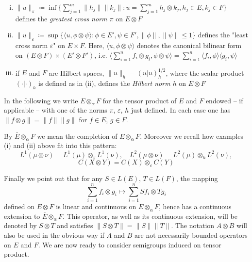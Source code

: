 \begin{enumerate}[(i), wide]
\item
$\|u\|_{\pi} \coloneqq \inf\{\sum_{j=1}^{m} \|h_{j}\|\|k_{j}\| : u = \sum_{j=1}^{m}h_{j} \otimes k_{j}, h_{j} \in E, k_{j} \in F\}$ defines the \emph{greatest cross norm $\pi$} on $E \otimes F$

\item
$\|u\|_{\varepsilon} \coloneqq \sup\{\langle u,\phi \otimes \psi\rangle : \phi \in E', \psi \in F', \|\phi\|, \|\psi\| \leq 1\}$ defines the "least cross norm $\varepsilon$" on $E \times F$. Here, $\langle u,\phi \otimes \psi\rangle$ denotes the canonical bilinear form on $(E \otimes F) \times (E' \otimes F')$, i.e. $\langle\sum_{i=1}^{n} f_{i} \otimes g_{i},\phi \otimes \psi\rangle = \sum_{i=1}^{n} \langle f_{i},\phi\rangle\langle g_{i},\psi\rangle$

\item
if $E$ and $F$ are Hilbert spaces, $\|u\|_{h} = (u|u)_{h}^{1/2}$, where the scalar product $(\cdot|\cdot)_{h}$ is defined as in (ii), defines the \emph{Hilbert norm $h$} on $E \otimes F$
\end{enumerate}


In the following we write $E \otimes_{\alpha} F$ for the tensor product of $E$ and $F$ endowed -- if applicable -- with one of the norms $\pi$, $\varepsilon$, $h$ just defined.
In each case one has $\|f \otimes g\| = \|f\|\|g\|$ for $f \in E$, $g \in F$.

By $\bar{E} \otimes_{\alpha} F$ we mean the completion of $E \otimes_{\alpha} F$. 
Moreover we recall how examples (i) and (ii) above fit into this pattern:
\[
    L^{1}(\mu \otimes \nu) = L^{1}(\mu) \otimes_{\pi} L^{1}(\nu), \quad L^{2}(\mu \otimes \nu) = L^{2}(\mu) \otimes_{h} L^{2}(\nu),
\]
\[
    C(X \otimes Y) = C(X) \otimes_{\varepsilon} C(Y)
\]

Finally we point out that for any $S \in L(E)$, $T \in L(F)$, the mapping
\[
    \sum_{i=1}^{n}f_{i} \otimes g_{i} \mapsto \sum_{i=1}^{n}Sf_{i} \otimes Tg_{i}
\]
defined on $E \otimes F$ is linear and continuous on $E \otimes_{\alpha} F$, hence has a continuous extension to $\bar{E} \otimes_{\alpha} F$. This operator, as well as its continuous extension, will be denoted by $S \otimes T$ and satisfies $\|S \otimes T\| = \|S\|\|T\|$. The notation $A \otimes B$ will also be used in the obvious way if $A$ and $B$ are not necessarily bounded operators on $E$ and $F$. We are now ready to consider semigroups induced on tensor product.

